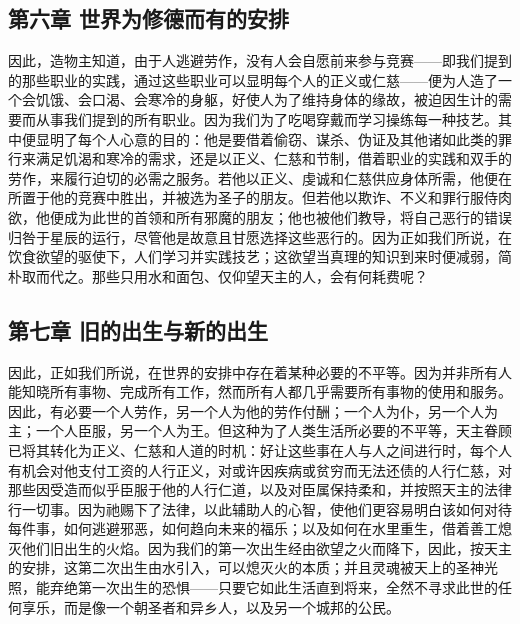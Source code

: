 
\subsection{第六章 世界为修德而有的安排}

因此，造物主知道，由于人逃避劳作，没有人会自愿前来参与竞赛——即我们提到的那些职业的实践，通过这些职业可以显明每个人的正义或仁慈——便为人造了一个会饥饿、会口渴、会寒冷的身躯，好使人为了维持身体的缘故，被迫因生计的需要而从事我们提到的所有职业。因为我们为了吃喝穿戴而学习操练每一种技艺。其中便显明了每个人心意的目的：他是要借着偷窃、谋杀、伪证及其他诸如此类的罪行来满足饥渴和寒冷的需求，还是以正义、仁慈和节制，借着职业的实践和双手的劳作，来履行迫切的必需之服务。若他以正义、虔诚和仁慈供应身体所需，他便在所置于他的竞赛中胜出，并被选为圣子的朋友。但若他以欺诈、不义和罪行服侍肉欲，他便成为此世的首领和所有邪魔的朋友；他也被他们教导，将自己恶行的错误归咎于星辰的运行，尽管他是故意且甘愿选择这些恶行的。因为正如我们所说，在饮食欲望的驱使下，人们学习并实践技艺；这欲望当真理的知识到来时便减弱，简朴取而代之。那些只用水和面包、仅仰望天主的人，会有何耗费呢？\par


\subsection{第七章 旧的出生与新的出生}

因此，正如我们所说，在世界的安排中存在着某种必要的不平等。因为并非所有人能知晓所有事物、完成所有工作，然而所有人都几乎需要所有事物的使用和服务。因此，有必要一个人劳作，另一个人为他的劳作付酬；一个人为仆，另一个人为主；一个人臣服，另一个人为王。但这种为了人类生活所必要的不平等，天主眷顾已将其转化为正义、仁慈和人道的时机：好让这些事在人与人之间进行时，每个人有机会对他支付工资的人行正义，对或许因疾病或贫穷而无法还债的人行仁慈，对那些因受造而似乎臣服于他的人行仁道，以及对臣属保持柔和，并按照天主的法律行一切事。因为祂赐下了法律，以此辅助人的心智，使他们更容易明白该如何对待每件事，如何逃避邪恶，如何趋向未来的福乐；以及如何在水里重生，借着善工熄灭他们旧出生的火焰。因为我们的第一次出生经由欲望之火而降下，因此，按天主的安排，这第二次出生由水引入，可以熄灭火的本质；并且灵魂被天上的圣神光照，能弃绝第一次出生的恐惧——只要它如此生活直到将来，全然不寻求此世的任何享乐，而是像一个朝圣者和异乡人，以及另一个城邦的公民。\par


